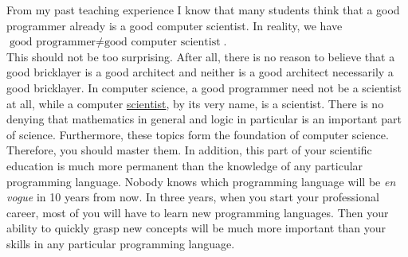 From my past teaching experience I know that many students think that a good programmer already is a
good computer scientist.  In reality, we have
\\[0.2cm]
\hspace*{1.3cm}
$\textrm{good programmer} \not= \textrm{good computer scientist}$.
\\[0.2cm]
This should not be too surprising.  After all, there is no reason to believe that a good bricklayer is a good
architect and neither is a good architect necessarily a good bricklayer.
In computer science, a good programmer need not be a scientist at all, while a {\color{blue}computer
  \underline{scientist}}, by its very name, is a {\color{blue}scientist}.  
There is no denying that {\color{blue}mathematics} in general and 
{\color{blue}logic} in particular is an important part of science.  Furthermore, these topics form the
foundation of computer science.  Therefore, you should master them.  In addition, this
part of your scientific education is much more permanent than the knowledge of any particular programming
language.  Nobody knows which programming language will be \emph{en vogue} in 10 years from now.  In three 
years, when you start your professional career, most of you will have to learn new
programming languages.   Then your ability to quickly grasp new concepts will be much more important than your
skills in any particular programming language. 

